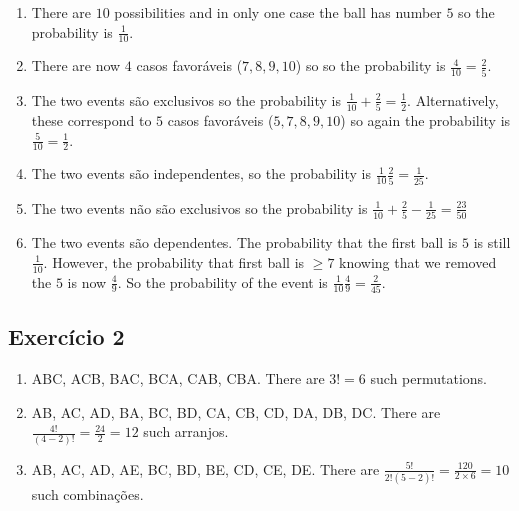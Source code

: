 \begin{enumerate}
\item There are $10$ possibilities and in only one case the ball has number $5$
  so the probability is $\frac{1}{10}$.
\item There are now $4$ casos favoráveis ($7,8,9,10$) so
  so the probability is $\frac{4}{10} = \frac{2}{5}$.
\item The two events são exclusivos so
  the probability is $\frac{1}{10} + \frac{2}{5} = \frac{1}{2}$.
  Alternatively, these correspond to $5$ casos favoráveis
  ($5,7,8,9,10$) so again the probability is $\frac{5}{10} = \frac{1}{2}$.
\item The two events são independentes,
  so the probability is $\frac{1}{10} \frac{2}{5} = \frac{1}{25}$.
\item The two events não são exclusivos so the probability is
  $\frac{1}{10} + \frac{2}{5} - \frac{1}{25} = \frac{23}{50}$
\item The two events são dependentes. The probability that the first ball is
  $5$ is still $\frac{1}{10}$. However, the probability that first ball
  is $\geq 7$ knowing that we removed the $5$ is now $\frac{4}{9}$.
  So the probability of the event is $\frac{1}{10} \frac{4}{9} = \frac{2}{45}$.
\end{enumerate}

\subsection*{Exercício 2}

\begin{enumerate}
\item ABC, ACB, BAC, BCA, CAB, CBA. There are $3! = 6$ such permutations.
\item AB, AC, AD, BA, BC, BD, CA, CB, CD, DA, DB, DC.
  There are $\frac{4!}{{(4-2)}!} = \frac{24}{2} = 12$ such arranjos.
\item AB, AC, AD, AE, BC, BD, BE, CD, CE, DE.
  There are $\frac{5!}{{2!}{(5-2)}!} = \frac{120}{2 \times 6} = 10$
  such combinações.
\end{enumerate}

